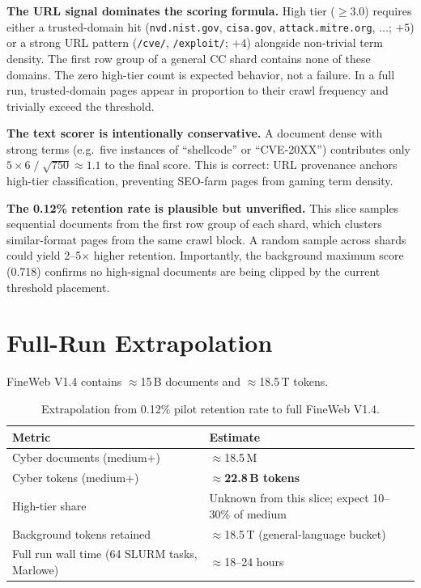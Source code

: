 \documentclass[11pt]{article}
\begin{document}
\textbf{The URL signal dominates the scoring formula.}
High tier ($\geq 3.0$) requires either a trusted-domain hit
(\texttt{nvd.nist.gov}, \texttt{cisa.gov}, \texttt{attack.mitre.org}, $\ldots$; $+5$)
or a strong URL pattern (\texttt{/cve/}, \texttt{/exploit/}; $+4$) alongside
non-trivial term density. The first row group of a general CC shard contains none
of these domains. The zero high-tier count is expected behavior, not a failure.
In a full run, trusted-domain pages appear in proportion to their crawl frequency
and trivially exceed the threshold.

\textbf{The text scorer is intentionally conservative.}
A document dense with strong terms (e.g.\ five instances of ``shellcode'' or
``CVE-20XX'') contributes only
$5 \times 6 \;/\; \sqrt{750} \approx 1.1$
to the final score. This is correct: URL provenance anchors high-tier classification,
preventing SEO-farm pages from gaming term density.

\textbf{The 0.12\% retention rate is plausible but unverified.}
This slice samples sequential documents from the first row group of each shard,
which clusters similar-format pages from the same crawl block. A random sample
across shards could yield 2--5$\times$ higher retention. Importantly, the background
maximum score (0.718) confirms no high-signal documents are being clipped by the
current threshold placement.

\section{Full-Run Extrapolation}

FineWeb V1.4 contains $\approx$15\,B documents and $\approx$18.5\,T tokens.

\begin{table}[h]
\centering
\begin{tabular}{ll}
\toprule
\textbf{Metric} & \textbf{Estimate} \\
\midrule
Cyber documents (medium+) & $\approx$18.5\,M \\
Cyber tokens (medium+)    & $\approx$\textbf{22.8\,B tokens} \\
High-tier share           & Unknown from this slice; expect 10--30\% of medium \\
Background tokens retained & $\approx$18.5\,T (general-language bucket) \\
Full run wall time (64 SLURM tasks, Marlowe) & $\approx$18--24 hours \\
\bottomrule
\end{tabular}
\caption{Extrapolation from 0.12\% pilot retention rate to full FineWeb V1.4.}
\end{table}
\end{document}
